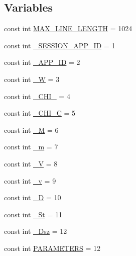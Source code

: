\subsection*{Variables}
\begin{DoxyCompactItemize}
\item 
const int \hyperlink{read__app__file_8hh_a2bed00245e126b4eff6914757499fa03}{M\-A\-X\-\_\-\-L\-I\-N\-E\-\_\-\-L\-E\-N\-G\-T\-H} = 1024
\item 
const int \hyperlink{read__app__file_8hh_a59a9ce5ac71fc3cf0cc8212f0b504ae6}{\-\_\-\-S\-E\-S\-S\-I\-O\-N\-\_\-\-A\-P\-P\-\_\-\-I\-D} = 1
\item 
const int \hyperlink{read__app__file_8hh_ae51a28367bc6544652422f59006f3b6b}{\-\_\-\-A\-P\-P\-\_\-\-I\-D} = 2
\item 
const int \hyperlink{read__app__file_8hh_a4aa1b73d64e16b578c6136709b6eb029}{\-\_\-\-W} = 3
\item 
const int \hyperlink{read__app__file_8hh_acfba94652d778a11a425f12218456d94}{\-\_\-\-C\-H\-I\-\_} = 4
\item 
const int \hyperlink{read__app__file_8hh_a86b2515e0c385f2faeb430c4cde8d9c7}{\-\_\-\-C\-H\-I\-\_\-\-C} = 5
\item 
const int \hyperlink{read__app__file_8hh_a4de4eab3d42e1216f709ece03e79b89e}{\-\_\-\-M} = 6
\item 
const int \hyperlink{read__app__file_8hh_a6205ea88780b1fb687eb5edfef6e1663}{\-\_\-m} = 7
\item 
const int \hyperlink{read__app__file_8hh_a3b254b25919d11b76feba8a02df2d89a}{\-\_\-\-V} = 8
\item 
const int \hyperlink{read__app__file_8hh_aa2bb9d7b455dc30a636a24b582d6a95b}{\-\_\-v} = 9
\item 
const int \hyperlink{read__app__file_8hh_a74e35f00d77d6fce2a39b0a0d5dbab08}{\-\_\-\-D} = 10
\item 
const int \hyperlink{read__app__file_8hh_afc86f016ce8337f4bb2dbc5b1dc114b3}{\-\_\-\-St} = 11
\item 
const int \hyperlink{read__app__file_8hh_a93952cfaa3c3a86172f423e065dc3a3c}{\-\_\-\-Dsz} = 12
\item 
const int \hyperlink{read__app__file_8hh_a4ebe0e540828a47ec24697bf0be11fe8}{P\-A\-R\-A\-M\-E\-T\-E\-R\-S} = 12
\end{DoxyCompactItemize}


